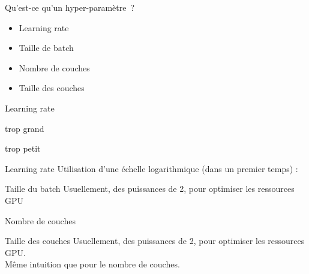\begin{frame}{Qu'est-ce qu'un hyper-paramètre~?}
  \begin{minipage}[l]{0.49\linewidth}
  \end{minipage}\hfill
  \begin{minipage}[l]{0.49\linewidth}
    \begin{itemize}
      \item Learning rate
      \item Taille de batch
      \item Nombre de couches
      \item Taille des couches
    \end{itemize}
  \end{minipage}\hfill
\end{frame}

\begin{frame}{Learning rate}
  \begin{minipage}[l]{0.49\linewidth}
    \begin{center}trop grand\end{center}
  \end{minipage}\hfill
  \begin{minipage}[l]{0.49\linewidth}
    \begin{center}trop petit\end{center}
  \end{minipage}\hfill

\end{frame}

\begin{frame}{Learning rate}
  Utilisation d'une échelle logarithmique (dans un premier temps) :
\end{frame}

\begin{frame}{Taille du batch}
  Usuellement, des puissances de 2, pour optimiser les ressources GPU
\end{frame}

\begin{frame}{Nombre de couches}
\end{frame}

\begin{frame}{Taille des couches}
  Usuellement, des puissances de 2, pour optimiser les ressources GPU. \\
  Même intuition que pour le nombre de couches.
\end{frame}
